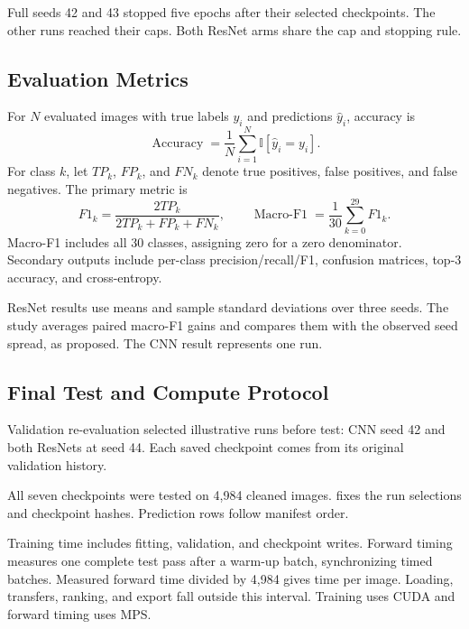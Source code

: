 Full seeds 42 and 43 stopped five epochs after their selected checkpoints. The other runs reached their caps. Both ResNet arms share the cap and stopping rule.

\subsection{Evaluation Metrics}

For $N$ evaluated images with true labels $y_i$ and predictions $\widehat{y}_i$, accuracy is
\begin{equation}
    \operatorname{Accuracy}
    =\frac{1}{N}\sum_{i=1}^{N}\mathbb{I}[\widehat{y}_i=y_i].
\end{equation}
For class $k$, let $TP_k$, $FP_k$, and $FN_k$ denote true positives, false positives, and false negatives. The primary metric is
\begin{equation}
    F1_k=\frac{2TP_k}{2TP_k+FP_k+FN_k},
    \qquad
    \operatorname{Macro\text{-}F1}=\frac{1}{30}\sum_{k=0}^{29}F1_k.
\end{equation}
Macro-F1 includes all 30 classes, assigning zero for a zero denominator. Secondary outputs include per-class precision/recall/F1, confusion matrices, top-3 accuracy, and cross-entropy.

ResNet results use means and sample standard deviations over three seeds. The study averages paired macro-F1 gains and compares them with the observed seed spread, as proposed. The CNN result represents one run.

\subsection{Final Test and Compute Protocol}

Validation re-evaluation selected illustrative runs before test: CNN seed 42 and both ResNets at seed 44. Each saved checkpoint comes from its original validation history.

All seven checkpoints were tested on 4,984 cleaned images.  fixes the run selections and checkpoint hashes. Prediction rows follow manifest order.

Training time includes fitting, validation, and checkpoint writes. Forward timing measures one complete test pass after a warm-up batch, synchronizing timed batches. Measured forward time divided by 4,984 gives time per image. Loading, transfers, ranking, and export fall outside this interval. Training uses CUDA and forward timing uses MPS.
